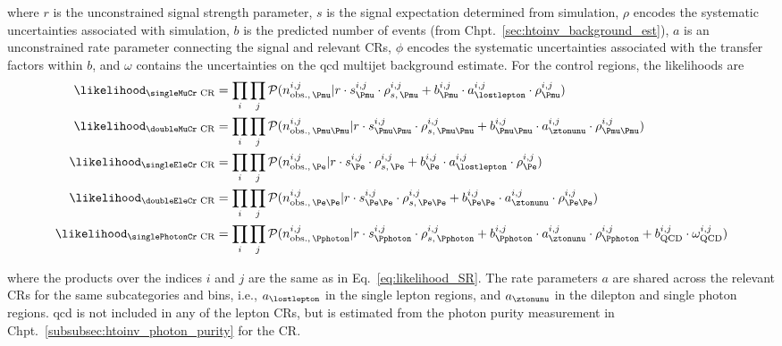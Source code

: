 where $r$ is the unconstrained signal strength parameter, $s$ is the signal expectation determined from simulation, $\rho$ encodes the systematic uncertainties associated with simulation, $b$ is the predicted number of events (from Chpt.~\ref{sec:htoinv_background_est}), $a$ is an unconstrained rate parameter connecting the signal and relevant \glspl{CR}, $\phi$ encodes the systematic uncertainties associated with the transfer factors within $b$, and $\omega$ contains the uncertainties on the \acrshort{qcd} multijet background estimate. For the control regions, the likelihoods are
\begin{equation}
    \begin{aligned}
\likelihood_{\text{\singleMuCr CR}} &= \prod_{i} \prod_{j} \mathcal{P}( n_{\mathrm{obs.}, \, \Pmu }^{i, j} | r \cdot s^{i, j}_{\Pmu} \cdot \rho_{s,\, \Pmu}^{i, j} + b_{\Pmu}^{i, j} \cdot a_{\lostlepton}^{i, j} \cdot \rho_{\Pmu}^{i, j} )\\
\likelihood_{\text{\doubleMuCr CR}} &= \prod_{i} \prod_{j} \mathcal{P}( n_{\mathrm{obs.}, \, \Pmu\Pmu }^{i, j} | r \cdot s^{i, j}_{\Pmu\Pmu} \cdot \rho_{s,\, \Pmu\Pmu}^{i, j} + b_{\Pmu\Pmu}^{i, j} \cdot a_{\ztonunu}^{i, j} \cdot \rho_{\Pmu\Pmu}^{i, j} )\\
\likelihood_{\text{\singleEleCr CR}} &= \prod_{i} \prod_{j} \mathcal{P}( n_{\mathrm{obs.}, \, \Pe }^{i, j} | r \cdot s^{i, j}_{\Pe} \cdot \rho_{s,\, \Pe}^{i, j} + b_{\Pe}^{i, j} \cdot a_{\lostlepton}^{i, j} \cdot \rho_{\Pe}^{i, j} )\\
\likelihood_{\text{\doubleEleCr CR}} &= \prod_{i} \prod_{j} \mathcal{P}( n_{\mathrm{obs.}, \, \Pe\Pe }^{i, j} | r \cdot s^{i, j}_{\Pe\Pe} \cdot \rho_{s,\, \Pe\Pe}^{i, j} + b_{\Pe\Pe}^{i, j} \cdot a_{\ztonunu}^{i, j} \cdot \rho_{\Pe\Pe}^{i, j} )\\
\likelihood_{\text{\singlePhotonCr CR}} &= \prod_{i} \prod_{j} \mathcal{P}( n_{\mathrm{obs.}, \, \Pphoton }^{i, j} | r \cdot s^{i, j}_{\Pphoton} \cdot \rho_{s,\, \Pphoton}^{i, j} + b_{\Pphoton}^{i, j} \cdot a_{\ztonunu}^{i, j} \cdot \rho_{\Pphoton}^{i, j} + b_{\mathrm{QCD}}^{i, j} \cdot \omega_{\mathrm{QCD}}^{i, j} )
    \end{aligned}
    \label{eq:likelihood_CRs}
\end{equation}

where the products over the indices $i$ and $j$ are the same as in Eq.~\ref{eq:likelihood_SR}. The rate parameters $a$ are shared across the relevant \glspl{CR} for the same subcategories and \ptmiss bins, i.e., $a_{\lostlepton}$ in the single lepton regions, and $a_{\ztonunu}$ in the dilepton and single photon regions. \acrshort{qcd} is not included in any of the lepton \glspl{CR}, but is estimated from the photon purity measurement in Chpt.~\ref{subsubsec:htoinv_photon_purity} for the \singlePhotonCr \gls{CR}.

